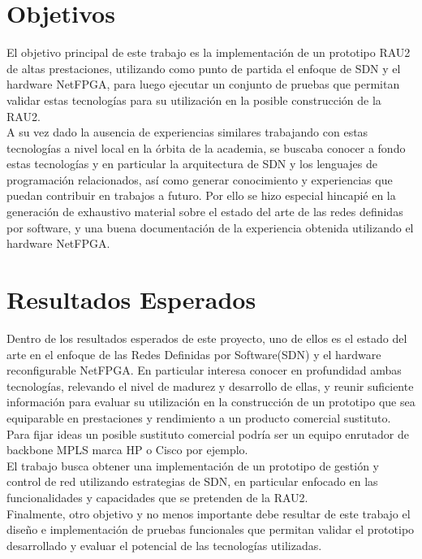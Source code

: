 \section{Objetivos}
El objetivo principal de este trabajo es la implementación de un prototipo RAU2 de altas prestaciones, utilizando como punto de partida el enfoque de SDN y el hardware NetFPGA, para luego ejecutar un conjunto de pruebas que permitan validar estas tecnologías para su utilización en  la posible construcción de la RAU2.\\

A su vez dado la ausencia de experiencias similares  trabajando con estas tecnologías a nivel local en la órbita de la academia, se buscaba conocer a fondo estas tecnologías y en particular la arquitectura de SDN y los lenguajes de programación relacionados, así como generar conocimiento y experiencias que puedan contribuir en trabajos a futuro. Por ello se hizo especial hincapié en la generación de exhaustivo material sobre el estado del arte de las redes definidas por software, y una buena documentación de la experiencia obtenida utilizando el hardware NetFPGA.

\section{Resultados Esperados}
Dentro de los resultados esperados de este proyecto, uno de ellos es el estado del arte en el enfoque de las Redes Definidas por Software(SDN) y el hardware reconfigurable NetFPGA. En particular interesa conocer en profundidad ambas tecnologías, relevando el nivel de madurez y desarrollo de ellas, y reunir suficiente información para evaluar su utilización en la construcción de un prototipo que sea equiparable en prestaciones y rendimiento a un producto comercial sustituto. Para fijar ideas un posible sustituto comercial podría ser un equipo enrutador de backbone MPLS marca HP o Cisco por ejemplo.\\
                   
El trabajo busca obtener una implementación de un prototipo de gestión y control de red utilizando estrategias de SDN, en particular enfocado en las funcionalidades y capacidades que se pretenden de la RAU2.\\

Finalmente, otro objetivo y no menos importante debe resultar de este trabajo el diseño e implementación de pruebas funcionales que permitan validar el prototipo desarrollado y evaluar el potencial de las tecnologías utilizadas.


